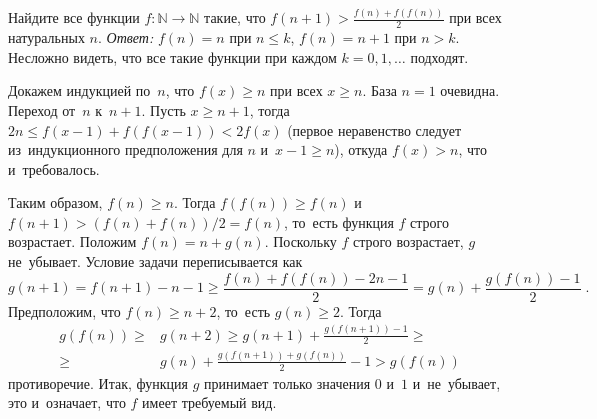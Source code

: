 \problem
Найдите все функции $f \colon \mathbb{N} \to \mathbb{N}$ такие, что
\(
    f(n + 1) > \frac{f(n) + f(f(n))}{2}
\)
при всех натуральных $n$. 
\solution
\emph{Ответ:} $f(n) = n$ при $n \leq k$, $f(n) = n + 1$ при $n > k$.
Несложно видеть, что все такие функции при каждом $k = 0, 1, \ldots$ подходят.
\par
Докажем индукцией по~$n$, что $f(x) \geq n$ при всех $x \geq n$.
База $n = 1$ очевидна.
Переход от~$n$ к~$n + 1$.
Пусть $x \geq n + 1$, тогда $2 n \leq f(x - 1) + f(f(x - 1)) < 2f(x)$
(первое неравенство следует из~индукционного предположения для $n$
и~$x - 1 \geq n$), откуда $f(x) > n$, что и~требовалось. 
\par
Таким образом, $f(n) \geq n$.
Тогда $f(f(n)) \geq f(n)$ и~$f(n + 1) > (f(n) + f(n)) / 2 = f(n)$,
то~есть функция $f$ строго возрастает.
Положим $f(n) = n + g(n)$.
Поскольку $f$ строго возрастает, $g$ не~убывает.
Условие задачи переписывается как 
\[
    g(n + 1)
=
    f(n + 1) - n - 1
\geq
    \frac{f(n) + f(f(n)) - 2 n - 1}{2}
=
    g(n) + \frac{g(f(n)) - 1}{2}
\;.\]
Предположим, что $f(n) \geq n + 2$, то~есть $g(n) \geq 2$.
Тогда
\begin{align*}
    g(f(n))
\geq{}&
    g(n + 2)
\geq
    g(n + 1) + \frac{g(f(n + 1)) - 1}{2}
\geq\\\geq{}&
    g(n) + \frac{g(f(n + 1)) + g(f(n))}{2} - 1
>
    g(f(n))
\end{align*}
противоречие.
Итак, функция $g$ принимает только значения $0$ и~$1$ и~не~убывает,
это и~означает, что $f$ имеет требуемый вид.
\endproblem
